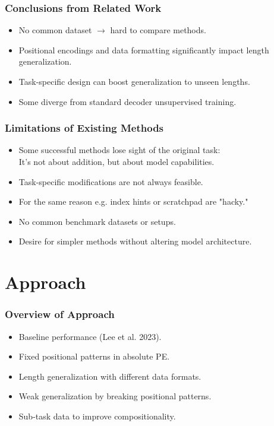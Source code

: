 \documentclass[14pt,aspectratio=169]{beamer}
\theoremstyle{remark}
\begin{document}
\begin{frame}
    \frametitle{Conclusions from Related Work}
    \begin{itemize}
        \item No common dataset $\rightarrow$ hard to compare methods.
        \item Positional encodings and data formatting significantly impact length generalization.
        \item Task-specific design can boost generalization to unseen lengths.
        \item Some diverge from standard decoder unsupervised training.
    \end{itemize}
\end{frame}

\begin{frame}
    \frametitle{Limitations of Existing Methods}
    \begin{itemize}
        \item Some successful methods lose sight of the original task:\\
              It's not about addition, but about model capabilities.
        \item Task-specific modifications are not always feasible.
        \item For the same reason e.g. index hints or scratchpad are "hacky."
        \item No common benchmark datasets or setups.
        \item Desire for simpler methods without altering model architecture.
    \end{itemize}
\end{frame}

\section{Approach}

\begin{frame}
    \frametitle{Overview of Approach}
    \begin{itemize}
        \item Baseline performance (Lee et al. 2023).
        \item Fixed positional patterns in absolute PE.
        \item Length generalization with different data formats.
        \item Weak generalization by breaking positional patterns.
        \item Sub-task data to improve compositionality.
    \end{itemize}
\end{frame}
\end{document}
